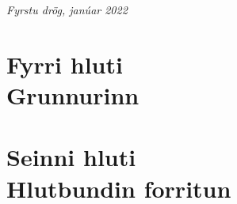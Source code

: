 \documentclass[11pt,fleqn]{book} %
\begin{document}
\noindent \textit{Fyrstu drög, janúar 2022} %


\usechapterimagefalse %


\pagestyle{empty} %

\tableofcontents %

\cleardoublepage %

\pagestyle{fancy} %


\part{Fyrri hluti\\ Grunnurinn}






















\part{Seinni hluti\\ Hlutbundin forritun}\label{Seinni hluti - hlutbundin forritun}
\end{document}
